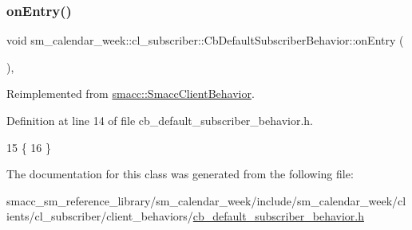 \subsubsection{\texorpdfstring{on\+Entry()}{onEntry()}}
{\footnotesize\ttfamily void sm\+\_\+calendar\+\_\+week\+::cl\+\_\+subscriber\+::\+Cb\+Default\+Subscriber\+Behavior\+::on\+Entry (\begin{DoxyParamCaption}{ }\end{DoxyParamCaption})\hspace{0.3cm}{\ttfamily [inline]}, {\ttfamily [virtual]}}



Reimplemented from \hyperlink{classsmacc_1_1SmaccClientBehavior_a7962382f93987c720ad432fef55b123f}{smacc\+::\+Smacc\+Client\+Behavior}.



Definition at line 14 of file cb\+\_\+default\+\_\+subscriber\+\_\+behavior.\+h.


\begin{DoxyCode}
15     \{
16     \}
\end{DoxyCode}


The documentation for this class was generated from the following file\+:\begin{DoxyCompactItemize}
\item 
smacc\+\_\+sm\+\_\+reference\+\_\+library/sm\+\_\+calendar\+\_\+week/include/sm\+\_\+calendar\+\_\+week/clients/cl\+\_\+subscriber/client\+\_\+behaviors/\hyperlink{sm__calendar__week_2include_2sm__calendar__week_2clients_2cl__subscriber_2client__behaviors_2cb_2dd2f4ccb4741b9c6659a707c9fdb5ee}{cb\+\_\+default\+\_\+subscriber\+\_\+behavior.\+h}\end{DoxyCompactItemize}
